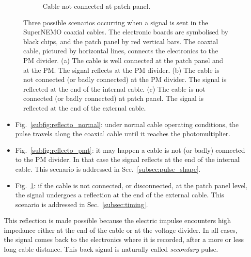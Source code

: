 \begin{figure}[h!]
\begin{subfigure}[b]{0.3\textwidth}
    \captionsetup{justification=centering}
    \caption{Cable not connected at patch panel.
      \label{subfig:reflecto_pp}}
  \end{subfigure}
  \caption{Three possible scenarios occurring when a signal is sent in the SuperNEMO coaxial cables.
    The electronic boards are symbolised by black chips, and the patch panel by red vertical bars.
    The coaxial cable, pictured by horizontal lines, connects the electronics to the PM divider.
    (a) The cable is well connected at the patch panel and at the PM. The signal reflects at the PM divider.
    (b) The cable is not connected (or badly connected) at the PM divider. The signal is reflected at the end of the internal cable.
    (c) The cable is not connected (or badly connected) at patch panel. The signal is reflected at the end of the external cable.
    \label{fig:reflecto_scheme}}
\end{figure}
\begin{itemize}
\item Fig.~\ref{subfig:reflecto_normal}: under normal cable operating conditions, the pulse travels along the coaxial cable until it reaches the photomultiplier.
\item Fig.~\ref{subfig:reflecto_pmt}: it may happen a cable is not (or badly) connected to the PM divider.
  In that case the signal reflects at the end of the internal cable.
  This scenario is addressed in Sec.~\ref{subsec:pulse_shape}.
\item Fig.~\ref{subfig:reflecto_pp}: if the cable is not connected, or disconnected, at the patch panel level, the signal undergoes a reflection at the end of the external cable.
  This scenario is addressed in Sec.~\ref{subsec:timing}.
\end{itemize}
This reflection is made possible because the electric impulse encounters high impedance either at the end of the cable or at the voltage divider.
In all cases, the signal comes back to the electronics where it is recorded, after a more or less long cable distance.
This back signal is naturally called \emph{secondary} pulse.

